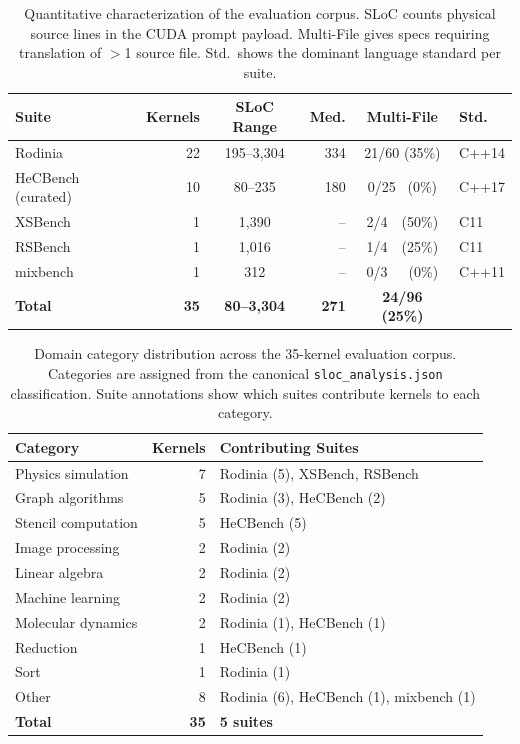 \begin{table}[htbp]
\centering
\caption{Quantitative characterization of the evaluation corpus. SLoC counts physical source lines in the CUDA prompt payload. Multi-File gives specs requiring translation of $>$1 source file. Std.\ shows the dominant language standard per suite.}
\label{tab:benchmark-characterization}
\small
\begin{tabular}{@{}lrcrcl@{}}
\toprule
Suite & Kernels & SLoC Range & Med. & Multi-File & Std. \\
\midrule
Rodinia         & 22 & 195--3{,}304 & 334 & 21/60 (35\%) & C++14 \\
HeCBench (curated) & 10 &    80--235    & 180 &  0/25 ~(0\%) & C++17 \\
XSBench         &  1 &    1{,}390    &  -- &  2/4~~(50\%) & C11   \\
RSBench         &  1 &    1{,}016    &  -- &  1/4~~(25\%) & C11   \\
mixbench        &  1 &       312     &  -- &  0/3~~~(0\%) & C++11 \\
\midrule
\textbf{Total}  & \textbf{35} & \textbf{80--3{,}304} & \textbf{271} & \textbf{24/96 (25\%)} & \\
\bottomrule
\end{tabular}
\end{table}


\begin{table}[htbp]
\centering
\caption{Domain category distribution across the 35-kernel evaluation corpus. Categories are assigned from the canonical \texttt{sloc\_analysis.json} classification. Suite annotations show which suites contribute kernels to each category.}
\label{tab:category-distribution}
\small
\begin{tabular}{@{}lrl@{}}
\toprule
Category & Kernels & Contributing Suites \\
\midrule
Physics simulation     & 7 & Rodinia (5), XSBench, RSBench \\
Graph algorithms       & 5 & Rodinia (3), HeCBench (2) \\
Stencil computation    & 5 & HeCBench (5) \\
Image processing       & 2 & Rodinia (2) \\
Linear algebra         & 2 & Rodinia (2) \\
Machine learning       & 2 & Rodinia (2) \\
Molecular dynamics     & 2 & Rodinia (1), HeCBench (1) \\
Reduction              & 1 & HeCBench (1) \\
Sort                   & 1 & Rodinia (1) \\
Other                  & 8 & Rodinia (6), HeCBench (1), mixbench (1) \\
\midrule
\textbf{Total}         & \textbf{35} & \textbf{5 suites} \\
\bottomrule
\end{tabular}
\end{table}

